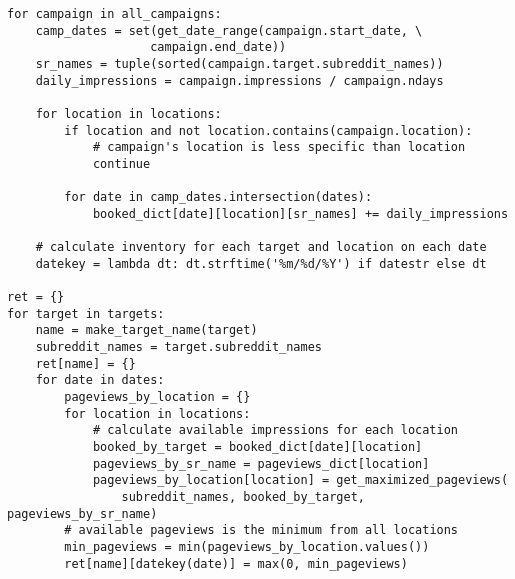 \documentclass[11pt, a4paper]{article}
\begin{document}
\hrulefill
\begin{lstlisting}[caption=3 nested for-loops - 2 times in a row - in a single function]
for campaign in all_campaigns:
    camp_dates = set(get_date_range(campaign.start_date, \
					campaign.end_date))
    sr_names = tuple(sorted(campaign.target.subreddit_names))
    daily_impressions = campaign.impressions / campaign.ndays

    for location in locations:
        if location and not location.contains(campaign.location):
            # campaign's location is less specific than location
            continue

        for date in camp_dates.intersection(dates):
            booked_dict[date][location][sr_names] += daily_impressions

    # calculate inventory for each target and location on each date
    datekey = lambda dt: dt.strftime('%m/%d/%Y') if datestr else dt

ret = {}
for target in targets:
    name = make_target_name(target)
    subreddit_names = target.subreddit_names
    ret[name] = {}
    for date in dates:
        pageviews_by_location = {}
        for location in locations:
            # calculate available impressions for each location
            booked_by_target = booked_dict[date][location]
            pageviews_by_sr_name = pageviews_dict[location]
            pageviews_by_location[location] = get_maximized_pageviews(
                subreddit_names, booked_by_target, pageviews_by_sr_name)
        # available pageviews is the minimum from all locations
        min_pageviews = min(pageviews_by_location.values())
        ret[name][datekey(date)] = max(0, min_pageviews)
\end{lstlisting}
\hrulefill
\end{document}
